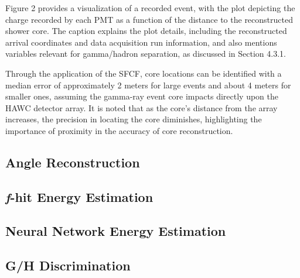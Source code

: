 Figure 2 provides a visualization of a recorded event, with the plot depicting the charge recorded by each PMT as a function of the distance to the reconstructed shower core. The caption explains the plot details, including the reconstructed arrival coordinates and data acquisition run information, and also mentions variables relevant for gamma/hadron separation, as discussed in Section 4.3.1.

Through the application of the SFCF, core locations can be identified with a median error of approximately 2 meters for large events and about 4 meters for smaller ones, assuming the gamma-ray event core impacts directly upon the HAWC detector array. It is noted that as the core's distance from the array increases, the precision in locating the core diminishes, highlighting the importance of proximity in the accuracy of core reconstruction.


\subsection{Angle Reconstruction}

\subsection{\textit{f}-hit Energy Estimation}

\subsection{Neural Network Energy Estimation}

\subsection{G/H Discrimination}
